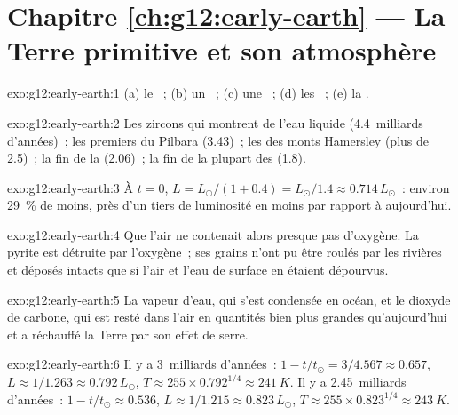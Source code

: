 \section*{Chapitre \ref{ch:g12:early-earth} --- La Terre primitive et son atmosphère}

\begin{solution}{exo:g12:early-earth:1}
(a) le ~; (b) un ~; (c) une ~; (d) les ~; (e) la .
\end{solution}

\begin{solution}{exo:g12:early-earth:2}
Les zircons qui montrent de l'eau liquide (4.4~milliards d'années)~; les
premiers  du Pilbara (3.43)~; les 
des monts Hamersley (plus de 2.5)~; la fin de la  (2.06)~;
la fin de la plupart des  (1.8).
\end{solution}

\begin{solution}{exo:g12:early-earth:3}
À $t = 0$, $L = L_\odot/(1 + 0.4) = L_\odot/1.4 \approx 0.714\,L_\odot$~:
environ \qty{29}{\percent} de moins, près d'un tiers de luminosité en moins
par rapport à aujourd'hui.
\end{solution}

\begin{solution}{exo:g12:early-earth:4}
Que l'air ne contenait alors presque pas d'oxygène. La pyrite est détruite
par l'oxygène~; ses grains n'ont pu être roulés par les rivières et déposés
intacts que si l'air et l'eau de surface en étaient dépourvus.
\end{solution}

\begin{solution}{exo:g12:early-earth:5}
La vapeur d'eau, qui s'est condensée en océan, et le dioxyde de carbone,
qui est resté dans l'air en quantités bien plus grandes qu'aujourd'hui et a
réchauffé la Terre par son effet de serre.
\end{solution}

\begin{solution}{exo:g12:early-earth:6}
Il y a 3~milliards d'années~: $1 - t/t_\odot = 3/4.567 \approx 0.657$, $L \approx
1/1.263 \approx 0.792\,L_\odot$, $T \approx 255 \times 0.792^{1/4} \approx
\qty{241}{K}$. Il y a 2.45~milliards d'années~: $1 - t/t_\odot \approx 0.536$, $L
\approx 1/1.215 \approx 0.823\,L_\odot$, $T \approx 255 \times 0.823^{1/4}
\approx \qty{243}{K}$.
\end{solution}

